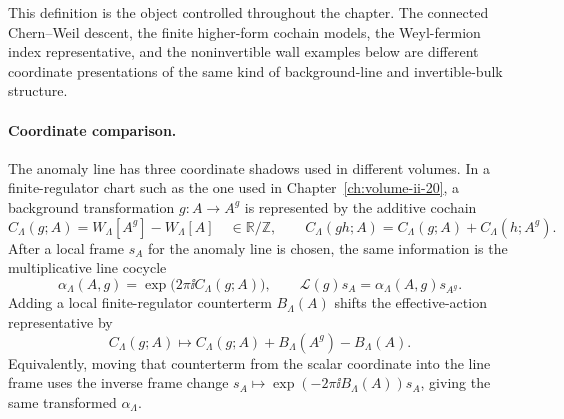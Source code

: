 This definition is the object controlled throughout the chapter.  The
connected Chern--Weil descent, the finite higher-form cochain models, the
Weyl-fermion index representative, and the noninvertible wall examples below
are different coordinate presentations of the same kind of background-line and
invertible-bulk structure.

\paragraph{Coordinate comparison.}
The anomaly line has three coordinate shadows used in different volumes.
In a finite-regulator chart such as the one used in
Chapter~\ref{ch:volume-ii-20}, a background transformation \(g:A\to A^g\)
is represented by the additive cochain
\begin{equation}
  C_\Lambda(g;A)
  =
  W_\Lambda[A^g]-W_\Lambda[A]
  \quad\in\mathbb R/\mathbb Z ,
  \qquad
  C_\Lambda(gh;A)
  =
  C_\Lambda(g;A)+C_\Lambda(h;A^g).
  \label{eq:inflow-finite-regulator-cochain-coordinate}
\end{equation}
After a local frame \(s_A\) for the anomaly line is chosen, the same
information is the multiplicative line cocycle
\begin{equation}
  \alpha_\Lambda(A,g)
  =
  \exp\!\bigl(2\pi\ii C_\Lambda(g;A)\bigr),
  \qquad
  \mathcal L(g)s_A=\alpha_\Lambda(A,g)s_{A^g}.
  \label{eq:inflow-cochain-to-line-cocycle-coordinate}
\end{equation}
Adding a local finite-regulator counterterm \(B_\Lambda(A)\) shifts the
effective-action representative by
\begin{equation}
  C_\Lambda(g;A)
  \longmapsto
  C_\Lambda(g;A)+B_\Lambda(A^g)-B_\Lambda(A).
  \label{eq:inflow-regulator-counterterm-coboundary-coordinate}
\end{equation}
Equivalently, moving that counterterm from the scalar coordinate into the line
frame uses the inverse frame change
\(s_A\mapsto\exp(-2\pi\ii B_\Lambda(A))s_A\), giving the same transformed
\(\alpha_\Lambda\).

